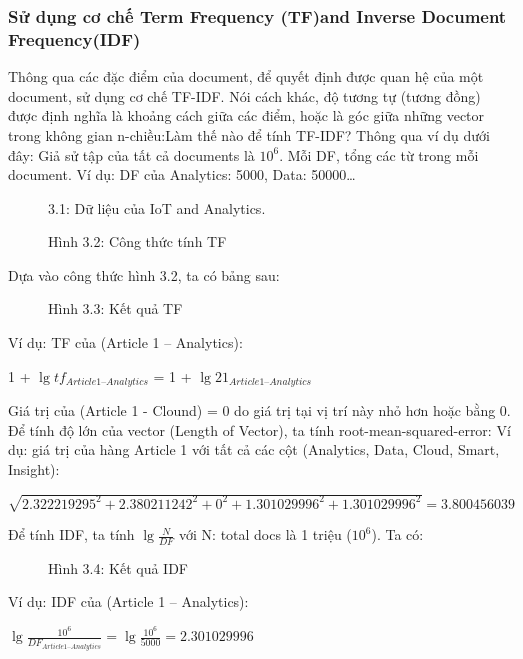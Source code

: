 \documentclass[a4paper,12pt,numbered,print,index,custombib, oneside, custommargin]{report}
\begin{document}
\subsubsection{Sử dụng cơ chế Term Frequency (TF)and Inverse Document Frequency(IDF)}
Thông qua các đặc điểm của document, để quyết định được quan hệ của một document, sử dụng cơ chế TF-IDF. Nói cách khác, độ tương tự (tương đồng) được định nghĩa là khoảng cách giữa các điểm, hoặc là góc giữa những vector trong không gian n-chiều:Làm thế nào để tính TF-IDF? Thông qua ví dụ dưới đây: Giả sử tập của tất cả documents là $10^6$. Mỗi DF, tổng các từ trong mỗi document. Ví dụ: DF của Analytics: 5000, Data: 50000…

\begin{figure}[h]
\centering
\caption{3.1: Dữ liệu của IoT and Analytics.}
\end{figure}

\begin{figure}[h]
\centering
\caption{Hình 3.2: Công thức tính TF}
\end{figure}

Dựa vào công thức hình 3.2, ta có bảng sau:
\begin{figure}[h]
\centering
\caption{Hình 3.3: Kết quả TF}
\end{figure}

Ví dụ: TF của (Article 1 – Analytics): \par
1 + $\lg tf _{Article 1– Analytics}$ = 1 + $\lg 21 _{Article 1– Analytics}$ \par

Giá trị của (Article 1 - Clound) = 0 do giá trị tại vị trí này nhỏ hơn hoặc bằng 0.
Để tính độ lớn của vector (Length of Vector), ta tính root-mean-squared-error:
Ví dụ: giá trị của hàng Article 1 với tất cả các cột (Analytics, Data, Cloud, Smart, Insight):\par
$\sqrt{2.322219295^2 + 2.380211242^2 + 0^2 + 1.301029996^2 + 1.301029996^2} = 3.800456039$ \par

Để tính IDF, ta tính $\lg \frac{N}{DF}$ với N: total docs là 1 triệu ($10^6$). Ta có:
\begin{figure}[h]
\centering
\caption{Hình 3.4: Kết quả IDF}
\end{figure}
Ví dụ: IDF của (Article 1 – Analytics): \par
$\lg \frac{10^6}{DF _{Article 1 – Analytics}} = \lg \frac{10^6}{5000} = 2.301029996$ \par
\end{document}
